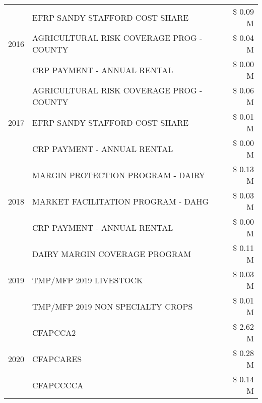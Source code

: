 \begin{tabular}{llr}
\cline{1-3}
\multirow[t]{3}{*}{2016} & EFRP SANDY STAFFORD COST SHARE & \$ 0.09 M \\
 & AGRICULTURAL RISK COVERAGE PROG - COUNTY & \$ 0.04 M \\
 & CRP PAYMENT - ANNUAL RENTAL & \$ 0.00 M \\
\cline{1-3}
\multirow[t]{3}{*}{2017} & AGRICULTURAL RISK COVERAGE PROG - COUNTY & \$ 0.06 M \\
 & EFRP SANDY STAFFORD COST SHARE & \$ 0.01 M \\
 & CRP PAYMENT - ANNUAL RENTAL & \$ 0.00 M \\
\cline{1-3}
\multirow[t]{3}{*}{2018} & MARGIN PROTECTION PROGRAM - DAIRY & \$ 0.13 M \\
 & MARKET FACILITATION PROGRAM - DAHG & \$ 0.03 M \\
 & CRP PAYMENT - ANNUAL RENTAL & \$ 0.00 M \\
\cline{1-3}
\multirow[t]{3}{*}{2019} & DAIRY MARGIN COVERAGE PROGRAM & \$ 0.11 M \\
 & TMP/MFP 2019 LIVESTOCK & \$ 0.03 M \\
 & TMP/MFP 2019 NON SPECIALTY CROPS & \$ 0.01 M \\
\cline{1-3}
\multirow[t]{3}{*}{2020} & CFAPCCA2 & \$ 2.62 M \\
 & CFAPCARES & \$ 0.28 M \\
 & CFAPCCCCA & \$ 0.14 M \\
\cline{1-3}
\bottomrule
\end{tabular}
